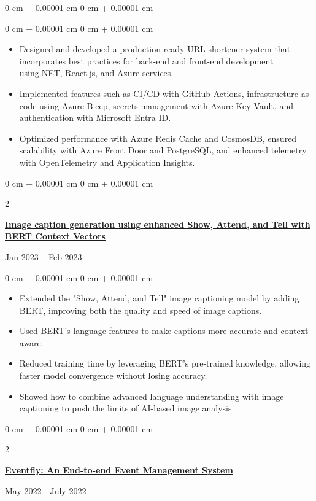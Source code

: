 \documentclass[10pt, letterpaper]{article}
\newenvironment{highlights}{
    \begin{itemize}[
        topsep=0.10 cm,
        parsep=0.10 cm,
        partopsep=0pt,
        itemsep=0pt,
        leftmargin=0 cm + 10pt
    ]
}{
    \end{itemize}
} %
\newenvironment{onecolentry}{
    \begin{adjustwidth}{
        0 cm + 0.00001 cm
    }{
        0 cm + 0.00001 cm
    }
}{
    \end{adjustwidth}
} %
\newenvironment{twocolentry}[2][]{
    \onecolentry
    \def\secondColumn{#2}
    \setcolumnwidth{\fill, 4.5 cm}
    \begin{paracol}{2}
}{
    \switchcolumn \raggedleft \secondColumn
    \end{paracol}
    \endonecolentry
} %
\begin{document}
\begin{onecolentry}
\begin{onecolentry}
\begin{highlights}
                    \item Designed and developed a production-ready URL shortener system that incorporates best practices for back-end and front-end development using.NET, React.js, and Azure services.
	            \item Implemented features such as CI/CD with GitHub Actions, infrastructure as code using Azure Bicep, secrets management with Azure Key Vault, and authentication with Microsoft Entra ID.
	           \item Optimized performance with Azure Redis Cache and CosmosDB, ensured scalability with Azure Front Door and PostgreSQL, and enhanced telemetry with OpenTelemetry and Application Insights.
                \end{highlights}
                
        \end{onecolentry}

        \begin{twocolentry}{
    {Jan 2023 – Feb 2023}
}
    \href{https://github.com/thromel/Image-Captioning-ML-Project}{\textbf{Image caption generation using enhanced Show, Attend, and Tell with BERT Context Vectors}}
\end{twocolentry}

\begin{onecolentry}
    \begin{highlights}
        \item Extended the "Show, Attend, and Tell" image captioning model by adding BERT, improving both the quality and speed of image captions.
        \item Used BERT's language features to make captions more accurate and context-aware.
        \item Reduced training time by leveraging BERT's pre-trained knowledge, allowing faster model convergence without losing accuracy.
        \item Showed how to combine advanced language understanding with image captioning to push the limits of AI-based image analysis.
    \end{highlights}
\end{onecolentry}
        
\begin{twocolentry}{
            {May 2022 - July 2022}
        }
            \href{https://github.com/eventfly/Microservices}{\textbf{Eventfly: An End-to-end Event Management System}}
        \end{twocolentry}
        

\end{onecolentry}
\end{document}
